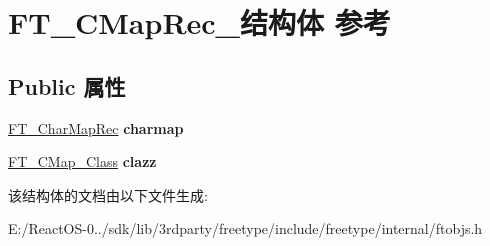 \hypertarget{struct_f_t___c_map_rec__}{}\section{F\+T\+\_\+\+C\+Map\+Rec\+\_\+结构体 参考}
\label{struct_f_t___c_map_rec__}
\subsection*{Public 属性}
\begin{DoxyCompactItemize}
\item 
\mbox{\label{struct_f_t___c_map_rec___a39fa6de9995d4ae4496b93e2b874b34e}} 
\hyperlink{struct_f_t___char_map_rec__}{F\+T\+\_\+\+Char\+Map\+Rec} {\bfseries charmap}
\item 
\mbox{\label{struct_f_t___c_map_rec___aa85db42650df0edb38f8af5887c0ac6a}} 
\hyperlink{struct_f_t___c_map___class_rec__}{F\+T\+\_\+\+C\+Map\+\_\+\+Class} {\bfseries clazz}
\end{DoxyCompactItemize}


该结构体的文档由以下文件生成\+:\begin{DoxyCompactItemize}
\item 
E\+:/\+React\+O\+S-\/0../sdk/lib/3rdparty/freetype/include/freetype/internal/ftobjs.\+h\end{DoxyCompactItemize}
